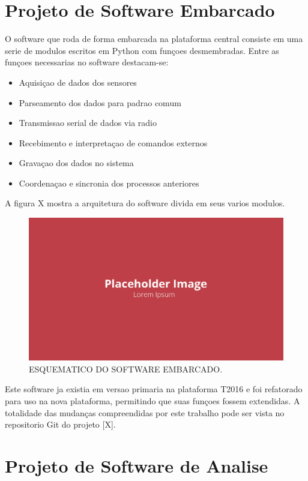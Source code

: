 \section{Projeto de Software Embarcado}

O software que roda de forma embarcada na plataforma central consiste em uma serie de modulos escritos em Python com funçoes desmembradas. Entre as funçoes necessarias no software destacam-se:

\begin{itemize}
    \item Aquisiçao de dados dos sensores
    \item Parseamento dos dados para padrao comum
    \item Transmissao serial de dados via radio
    \item Recebimento e interpretaçao de comandos externos
    \item Gravaçao dos dados no sistema
    \item Coordenaçao e sincronia dos processos anteriores
\end{itemize}

A figura X mostra a arquitetura do software divida em seus varios modulos.

\begin{figure}[!ht]
    \centering
    \includegraphics[width=.8\linewidth]{figuras/placeholder.png}
    \caption{ESQUEMATICO DO SOFTWARE EMBARCADO\cite{autor}.}
    \label{fig:placeholder}
\end{figure}

Este software ja existia em versao primaria na plataforma T2016 e foi refatorado para uso na nova plataforma, permitindo que suas funçoes fossem extendidas. A totalidade das mudanças compreendidas por este trabalho pode ser vista no repositorio Git do projeto [X]. 

\section{Projeto de Software de Analise}

